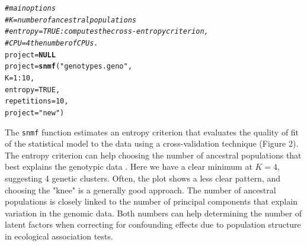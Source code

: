 \documentclass[12pt,a4paper,oneside]{article}\usepackage[]{graphicx}\usepackage[]{color}
\makeatletter
\newcommand{\hlnum}[1]{\textcolor[rgb]{0.686,0.059,0.569}{#1}}%
\newcommand{\hlstr}[1]{\textcolor[rgb]{0.192,0.494,0.8}{#1}}%
\newcommand{\hlcom}[1]{\textcolor[rgb]{0.678,0.584,0.686}{\textit{#1}}}%
\newcommand{\hlopt}[1]{\textcolor[rgb]{0,0,0}{#1}}%
\newcommand{\hlstd}[1]{\textcolor[rgb]{0.345,0.345,0.345}{#1}}%
\newcommand{\hlkwa}[1]{\textcolor[rgb]{0.161,0.373,0.58}{\textbf{#1}}}%
\newcommand{\hlkwb}[1]{\textcolor[rgb]{0.69,0.353,0.396}{#1}}%
\newcommand{\hlkwc}[1]{\textcolor[rgb]{0.333,0.667,0.333}{#1}}%
\newcommand{\hlkwd}[1]{\textcolor[rgb]{0.737,0.353,0.396}{\textbf{#1}}}%
\newenvironment{kframe}{%
 \def\at@end@of@kframe{}%
 \ifinner\ifhmode%
  \def\at@end@of@kframe{\end{minipage}}%
  \begin{minipage}{\columnwidth}%
 \fi\fi%
 \def\FrameCommand##1{\hskip\@totalleftmargin \hskip-\fboxsep
 \colorbox{shadecolor}{##1}\hskip-\fboxsep
     \hskip-\linewidth \hskip-\@totalleftmargin \hskip\columnwidth}%
 \MakeFramed {\advance\hsize-\width
   \@totalleftmargin\z@ \linewidth\hsize
   \@setminipage}}%
 {\par\unskip\endMakeFramed%
 \at@end@of@kframe}
\newenvironment{knitrout}{}{} %
\makeatother
\begin{document}
\begin{knitrout}
\color{fgcolor}\begin{kframe}
\begin{alltt}
\hlcom{# main options}
\hlcom{# K = number of ancestral populations}
\hlcom{# entropy = TRUE: computes the cross-entropy criterion, }
\hlcom{# CPU = 4 the number of CPUs.}
\hlstd{project} \hlkwb{=} \hlkwa{NULL}
\hlstd{project} \hlkwb{=} \hlkwd{snmf}\hlstd{(}\hlstr{"genotypes.geno"}\hlstd{,}
               \hlkwc{K} \hlstd{=} \hlnum{1}\hlopt{:}\hlnum{10}\hlstd{,}
               \hlkwc{entropy} \hlstd{=} \hlnum{TRUE}\hlstd{,}
               \hlkwc{repetitions} \hlstd{=} \hlnum{10}\hlstd{,}
               \hlkwc{project} \hlstd{=} \hlstr{"new"}\hlstd{)}
\end{alltt}
\end{kframe}
\end{knitrout}


The {\tt snmf} function estimates an entropy criterion that evaluates the quality of fit of the statistical model to the data using a cross-validation technique (Figure 2). The entropy criterion can help choosing the number of ancestral populations that best explains the genotypic data \citep{Alexander_2011, Frichot_2014}. Here we have a clear minimum at $K = 4$, suggesting 4 genetic clusters. Often, the plot shows a less clear pattern, and choosing the "knee" is a generally good approach. The number of ancestral populations is closely linked to the number of principal components that explain variation in the genomic data. Both numbers can help determining the number of latent factors when correcting for confounding effects due to population structure in ecological association tests. 
\end{document}

